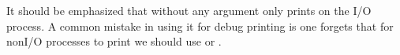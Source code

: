 \documentclass[letterpaper,10pt,english]{sphinxmanual}
\begin{document}
\begin{sphinxVerbatim}[commandchars=\\\{\}]
  
\end{sphinxVerbatim}

\sphinxAtStartPar
It should be emphasized that  without any argument only
prints on the I/O process.  A common mistake in using it for debug
printing is one forgets that for non\sphinxhyphen{}I/O processes to print we should
use  or .
\end{document}
